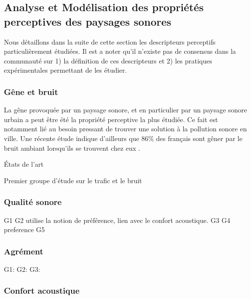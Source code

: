 \subsection{Analyse et Modélisation des propriétés perceptives des paysages sonores}
\label{sec:descripteursPercetifs}

Nous détaillons dans la suite de cette section les descripteurs perceptifs particulièrement étudiées. Il est a noter qu'il n'existe pas de consensus dans la communauté sur 1) la définition de ces descripteurs et 2) les pratiques expérimentales permettant de les étudier. 

\subsubsection{Gêne et bruit}

La gêne provoquée par un paysage sonore, et en particulier par un paysage sonore urbain a peut être été la propriété perceptive la plus étudiée. Ce fait est notamment lié au besoin pressant de trouver une solution à la pollution sonore en ville. Une récente étude indique d'ailleurs que 86\% des français sont gêner par le bruit ambiant lorsqu'ils se trouvent chez eux \citep{noiseFrench}.

États de l'art \citep{marquis2005noisea,marquis2005noiseb}

Premier groupe d'étude sur le trafic et le bruit \citep{gille2016testing,gille2016noise,gille2016dose,morel2016noise,trolle2015perception,marquis2015simulated,klein2015spectral,}

\subsubsection{Qualité sonore}

G1 \citep{brocolini2012prediction,ricciardi2015sound}
G2 \citep{hong2013designing} utilise la notion de préférence, lien avec le confort acoustique.
G3 \citep{ozcevik2012laboratory}
G4 \citep{yu2010factors} preference
G5 \citep{nilsson2006soundscape,nilsson2007acoustic}

\subsubsection{Agrément}

G1: \citep{garcia2012validation} 
G2: \citep{lavandier2006contribution}
G3: \citep{guillen2007importance}

\subsubsection{Confort acoustique}

